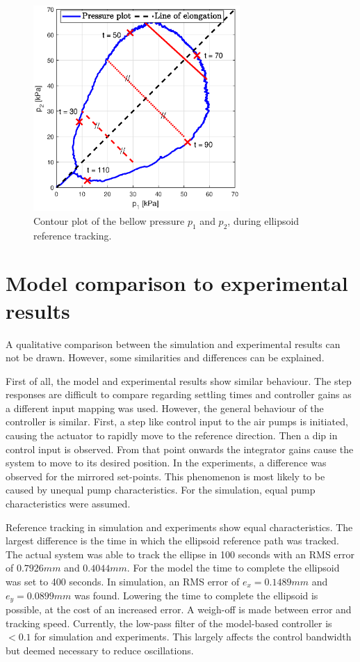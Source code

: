 \begin{figure}[H] 
       \centering
    \includegraphics[width = 0.7\textwidth]{Figures/Chapter5/pcontourellips.eps}
    \caption{Contour plot of the bellow pressure $p_1$ and $p_2$, during ellipsoid reference tracking.}
    \label{fig5:pressureellips}
\end{figure}

 

\section{Model comparison to experimental results}

A qualitative comparison between the simulation and experimental results can not be drawn. However, some similarities and differences can be explained. 

First of all, the model and experimental results show similar behaviour. The step responses are difficult to compare regarding settling times and controller gains as a different input mapping was used. However, the general behaviour of the controller is similar. First, a step like control input to the air pumps is initiated, causing the actuator to rapidly move to the reference direction. Then a dip in control input is observed. From that point onwards the integrator gains cause the system to move to its desired position. In the experiments, a difference was observed for the mirrored set-points. This phenomenon is most likely to be caused by unequal pump characteristics. For the simulation, equal pump characteristics were assumed. 

Reference tracking in simulation and experiments show equal characteristics. The largest difference is the time in which the ellipsoid reference path was tracked. The actual system was able to track the ellipse in 100 seconds with an RMS error of $0.7926 mm$ and $0.4044 mm$. For the model the time to complete the ellipsoid was set to 400 seconds. In simulation, an RMS error of $e_x = 0.1489 mm$ and $e_y = 0.0899 mm$ was found. Lowering the time to complete the ellipsoid is possible, at the cost of an increased error. A weigh-off is made between error and tracking speed. Currently, the low-pass filter of the model-based controller is $<0.1$ for simulation and experiments. This largely affects the control bandwidth but deemed necessary to reduce oscillations. 
